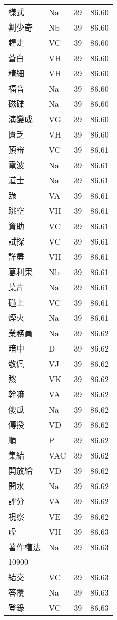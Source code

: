 \documentclass[twocolumn]{book}
\begin{document}
\begin{supertabular}{llrr}
樣式 & Na & 39 &  86.60\\
劉少奇 & Nb & 39 &  86.60\\
趕走 & VC & 39 &  86.60\\
蒼白 & VH & 39 &  86.60\\
精細 & VH & 39 &  86.60\\
福音 & Na & 39 &  86.60\\
磁碟 & Na & 39 &  86.60\\
演變成 & VG & 39 &  86.60\\
匱乏 & VH & 39 &  86.60\\
預審 & VC & 39 &  86.61\\
電波 & Na & 39 &  86.61\\
道士 & Na & 39 &  86.61\\
跪 & VA & 39 &  86.61\\
跳空 & VH & 39 &  86.61\\
資助 & VC & 39 &  86.61\\
試探 & VC & 39 &  86.61\\
詳盡 & VH & 39 &  86.61\\
葛利果 & Nb & 39 &  86.61\\
葉片 & Na & 39 &  86.61\\
碰上 & VC & 39 &  86.61\\
煙火 & Na & 39 &  86.61\\
業務員 & Na & 39 &  86.62\\
暗中 & D & 39 &  86.62\\
敬佩 & VJ & 39 &  86.62\\
愁 & VK & 39 &  86.62\\
幹嘛 & VA & 39 &  86.62\\
傻瓜 & Na & 39 &  86.62\\
傳授 & VD & 39 &  86.62\\
順 & P & 39 &  86.62\\
集結 & VAC & 39 &  86.62\\
開放給 & VD & 39 &  86.62\\
開水 & Na & 39 &  86.62\\
評分 & VA & 39 &  86.62\\
視察 & VE & 39 &  86.62\\
虛 & VH & 39 &  86.63\\
著作權法 & Na & 39 &  86.63\\
10900\\
結交 & VC & 39 &  86.63\\
答覆 & Na & 39 &  86.63\\
登錄 & VC & 39 &  86.63\\

\end{supertabular}
\end{document}
